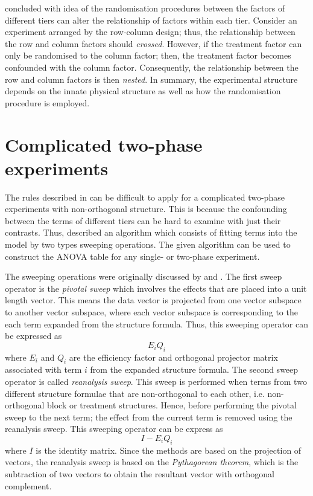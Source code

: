 \documentclass[11pt,a4paper]{article}
\begin{document}
\cite{Brien1983} concluded with idea of the randomisation procedures between the factors of different tiers can alter the relationship of factors within each tier. Consider an experiment arranged by the row-column design; thus, the relationship between the row and column factors should \emph{crossed}. However, if the treatment factor can only be randomised to the column factor; then, the treatment factor becomes confounded with the column factor. Consequently, the relationship between the row and column factors is then \emph{nested}. In summary, the experimental structure depends on the innate physical structure as well as how the randomisation procedure is employed. 


\section{Complicated two-phase experiments}
The rules described in \cite{Brien1983} can be difficult to apply for a complicated two-phase experiments with non-orthogonal structure. This is because the confounding between the terms of different tiers can be hard to examine with just their contrasts. Thus, \cite{Brien1999} described an algorithm which consists of fitting terms into the model by two types sweeping operations.  The given algorithm can be used to construct the ANOVA table for any single- or two-phase experiment. 

The sweeping operations were originally discussed by \cite{Wilkinson1970} and \cite{Payne1977}. The first sweep operator is the \emph{pivotal sweep} which involves the effects that are placed into a unit length vector. This means the data vector is projected from one vector subspace to another vector subspace, where each vector subspace is corresponding to the each term expanded from the structure formula. Thus, this sweeping operator can be expressed as 
\begin{equation}
E_i Q_i
\end{equation}
where $E_i$ and $Q_i$ are the efficiency factor and orthogonal projector matrix associated with term $i$ from the expanded structure formula. The second sweep operator is called \emph{reanalysis sweep}. This sweep is performed when terms from two different structure formulae that are non-orthogonal to each other, i.e. non-orthogonal block or treatment structures. Hence, before performing the pivotal sweep to the next term; the effect from the current term is removed using the reanalysis sweep. This sweeping operator can be express as 
\begin{equation}
I - E_i Q_i
\end{equation}
where $I$ is the identity matrix. Since the methods are based on the projection of vectors, the reanalysis sweep is based on the \emph{Pythagorean theorem}, which is the subtraction of two vectors to obtain the resultant vector with orthogonal complement.
\end{document}
